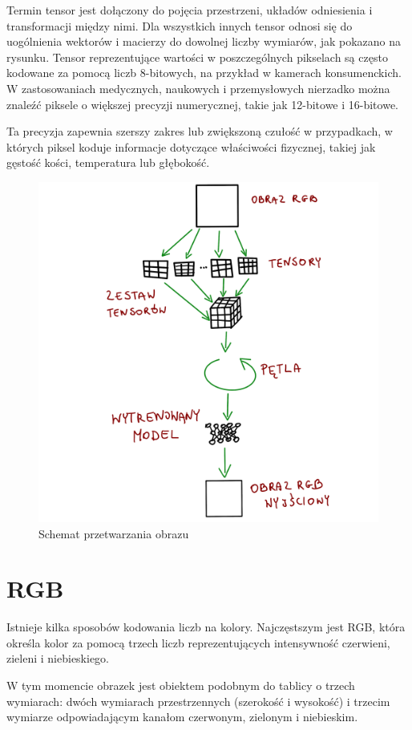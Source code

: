 \documentclass[brudnopis]{xmgr}
\begin{document}
Termin tensor jest dołączony do pojęcia przestrzeni, układów odniesienia i transformacji między nimi. Dla wszystkich innych tensor odnosi się do uogólnienia wektorów i macierzy do dowolnej liczby wymiarów, jak pokazano na rysunku.
Tensor reprezentujące wartości w poszczególnych pikselach są często kodowane za pomocą liczb 8-bitowych, na przykład w kamerach konsumenckich. W zastosowaniach medycznych, naukowych i przemysłowych nierzadko można znaleźć piksele o większej precyzji numerycznej, takie jak 12-bitowe i 16-bitowe.

 Ta precyzja zapewnia szerszy zakres lub zwiększoną czułość w przypadkach, w których piksel koduje informacje dotyczące właściwości fizycznej, takiej jak gęstość kości, temperatura lub głębokość.
 
 \begin{figure}[!tbh]
\centering
\includegraphics[width=.8\hsize]{fig/5}
\caption{Schemat przetwarzania obrazu\label{RYS.5}}
\end{figure}
 
 \section{RGB\label{s:dsssl}}
 Istnieje kilka sposobów kodowania liczb na kolory. Najczęstszym jest
RGB, która określa kolor za pomocą trzech liczb reprezentujących intensywność czerwieni, zieleni i niebieskiego. 

W tym momencie obrazek jest obiektem podobnym do tablicy o trzech wymiarach: dwóch wymiarach przestrzennych (szerokość i wysokość) i trzecim wymiarze odpowiadającym kanałom czerwonym, zielonym i niebieskim. 
\end{document}
